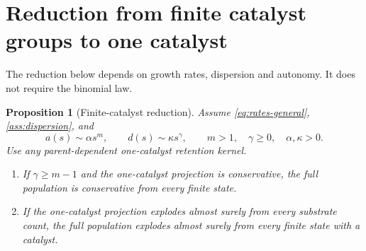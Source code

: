 \documentclass[11pt,a4paper]{article}
\newtheorem{proposition}[theorem]{Proposition}
\theoremstyle{remark}\newtheorem{remark}[theorem]{Remark}
\begin{document}
\section{Reduction from finite catalyst groups to one catalyst}\label{sec:reduction}

The reduction below depends on growth rates, dispersion and autonomy. It does not require the binomial law.

\begin{proposition}[Finite-catalyst reduction]\label{prop:reduction}
Assume \eqref{eq:rates-general}, \ref{ass:dispersion}, and
\begin{equation}\label{eq:equivalents}
a(s)\sim\alpha s^m,\qquad d(s)\sim\kappa s^\gamma,
\qquad m>1,\quad\gamma\ge0,\quad\alpha,\kappa>0.
\end{equation}
Use any parent-dependent one-catalyst retention kernel.
\begin{enumerate}[label=(\roman*)]
\item If $\gamma\ge m-1$ and the one-catalyst projection is conservative, the full population is conservative from every finite state.
\item If the one-catalyst projection explodes almost surely from every substrate count, the full population explodes almost surely from every finite state with a catalyst.
\end{enumerate}
\end{proposition}
\end{document}
